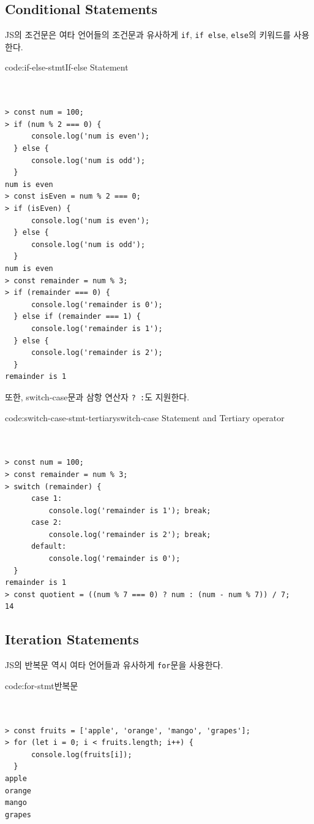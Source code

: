 
\subsection*{Conditional Statements}

JS의 조건문은 여타 언어들의 조건문과 유사하게 \texttt{if}, \texttt{if else}, \texttt{else}의 키워드를 사용한다.

\begin{codeenv}{code:if-else-stmt}{If-else Statement}\begin{verbatim}


> const num = 100;
> if (num % 2 === 0) {
      console.log('num is even');
  } else {
      console.log('num is odd');
  }
num is even
> const isEven = num % 2 === 0;
> if (isEven) {
      console.log('num is even');
  } else {
      console.log('num is odd');
  }
num is even
> const remainder = num % 3;
> if (remainder === 0) {
      console.log('remainder is 0');
  } else if (remainder === 1) {
      console.log('remainder is 1');
  } else {
      console.log('remainder is 2');
  }
remainder is 1
\end{verbatim}
\end{codeenv}
\pagebreak

또한, switch-case문과 삼항 연산자 \texttt{? :}도 지원한다.

\begin{codeenv}{code:switch-case-stmt-tertiary}{switch-case Statement and Tertiary operator}\begin{verbatim}


> const num = 100;
> const remainder = num % 3;
> switch (remainder) {
      case 1:
          console.log('remainder is 1'); break;
      case 2:
          console.log('remainder is 2'); break;
      default:
          console.log('remainder is 0');
  }
remainder is 1
> const quotient = ((num % 7 === 0) ? num : (num - num % 7)) / 7;
14
\end{verbatim}
\end{codeenv}

\subsection*{Iteration Statements}

JS의 반복문 역시 여타 언어들과 유사하게 \texttt{for}문을 사용한다.

\begin{codeenv}{code:for-stmt}{반복문}\begin{verbatim}


> const fruits = ['apple', 'orange', 'mango', 'grapes'];
> for (let i = 0; i < fruits.length; i++) {
      console.log(fruits[i]);
  }
apple
orange
mango
grapes
\end{verbatim}
\end{codeenv}

